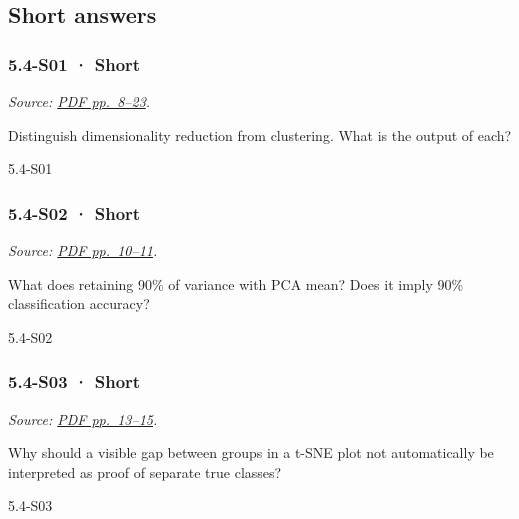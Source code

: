 \subsection{Short answers}\label{short-answers-16}

\noindent\begin{minipage}{\linewidth}

\subsubsection{5.4-S01 · Short}\label{s01-short-15}

\emph{Source:
\href{../Lecture\%20Slides/5.4.\%20Unsupervised\%20learning.pdf\#page=8}{PDF
pp.~8--23}.}

Distinguish dimensionality reduction from clustering. What is the output
of each?

\begin{solution}[20mm]{5.4-S01}

\end{solution}
\end{minipage}\par\medskip

\noindent\begin{minipage}{\linewidth}

\subsubsection{5.4-S02 · Short}\label{s02-short-15}

\emph{Source:
\href{../Lecture\%20Slides/5.4.\%20Unsupervised\%20learning.pdf\#page=10}{PDF
pp.~10--11}.}

What does retaining 90\% of variance with PCA mean? Does it imply 90\%
classification accuracy?

\begin{solution}[20mm]{5.4-S02}

\end{solution}
\end{minipage}\par\medskip

\noindent\begin{minipage}{\linewidth}

\subsubsection{5.4-S03 · Short}\label{s03-short-15}

\emph{Source:
\href{../Lecture\%20Slides/5.4.\%20Unsupervised\%20learning.pdf\#page=13}{PDF
pp.~13--15}.}

Why should a visible gap between groups in a t-SNE plot not
automatically be interpreted as proof of separate true classes?

\begin{solution}[20mm]{5.4-S03}

\end{solution}
\end{minipage}\par\medskip

